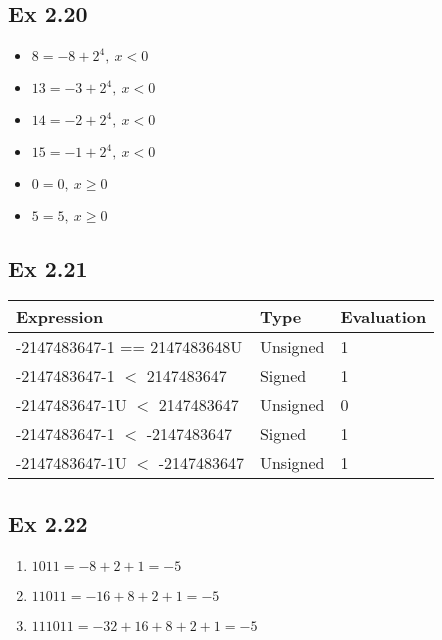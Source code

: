 \subsection{Ex 2.20}
\begin{itemize}
    \item $8 = -8 + 2^4,\ x < 0$
    \item $13 = -3 + 2^4,\ x < 0$
    \item $14 = -2 + 2^4,\ x < 0$\\
    \item $15 = -1 + 2^4,\ x < 0$
    \item $0 = 0,\ x \geq 0$
    \item $5 = 5,\ x \geq 0$
\end{itemize}

\subsection{Ex 2.21}
\begin{table}[h]
    \centering
    \begin{tabular}{lll}
        \toprule
        Expression & Type & Evaluation \\
        \midrule
        -2147483647-1 == 2147483648U & Unsigned & 1\\
        -2147483647-1 $<$ 2147483647 & Signed & 1\\
        -2147483647-1U $<$ 2147483647 & Unsigned & 0\\
        -2147483647-1 $<$ -2147483647 & Signed & 1\\
        -2147483647-1U $<$ -2147483647 & Unsigned & 1\\
        \bottomrule
    \end{tabular}
\end{table}

\subsection{Ex 2.22}
\begin{enumerate}
    \item $1011 = -8 + 2 + 1 = -5$
    \item $11011 = -16 + 8 + 2 + 1 = -5$
    \item $111011 = -32 + 16 + 8 + 2 + 1 = -5$
\end{enumerate}


